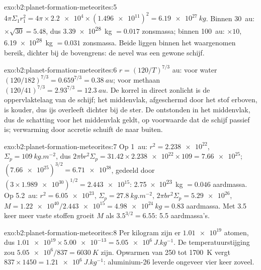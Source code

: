 \begin{solution}{exo:b2:planet-formation-meteorites:5}
$4\pi\Sigma_1 r_1^2 = 4\pi\times\num{2.2e4}\times(\num{1.496e11})^2 =
\qty{6.19e27}{kg}$. Binnen \qty{30}{au}: $\times\sqrt{30} = 5.48$, dus
\qty{3.39e28}{kg} $= 0.017$ zonsmassa; binnen \qty{100}{au}: $\times10$,
\qty{6.19e28}{kg} $= 0.031$ zonsmassa. Beide liggen binnen het waargenomen bereik,
dichter bij de bovengrens: de nevel was een gewone schijf.
\end{solution}

\begin{solution}{exo:b2:planet-formation-meteorites:6}
$r = (120/T)^{7/3}$ au: voor water $(120/182)^{7/3} = 0.659^{7/3} =
\qty{0.38}{au}$; voor methaan $(120/41)^{7/3} = 2.93^{7/3} = \qty{12.3}{au}$.
De korrel in direct zonlicht is de oppervlaktelaag van de schijf; het middenvlak,
afgeschermd door het stof erboven, is kouder, dus ijs overleeft dichter bij de ster. De
 ontstonden in het middenvlak, dus de schatting voor het middenvlak geldt, op voorwaarde dat
de schijf passief is; verwarming door accretie schuift de  naar buiten.
\end{solution}

\begin{solution}{exo:b2:planet-formation-meteorites:7}
Op \qty{1}{au}: $r^2 = \num{2.238e22}$, $\Sigma_p = \qty{109}{kg.m^{-2}}$, dus
$2\pi b r^2\Sigma_p = 31.42\times\num{2.238e22}\times109 = \num{7.66e25}$;
$(\num{7.66e25})^{3/2} = \num{6.71e38}$, gedeeld door
$(3\times\num{1.989e30})^{1/2} = \num{2.443e15}$: \qty{2.75e23}{kg}
$= 0.046$ aardmassa. Op \qty{5.2}{au}: $r^2 = \num{6.05e23}$,
$\Sigma_p = \qty{27.8}{kg.m^{-2}}$, $2\pi b r^2\Sigma_p = \num{5.29e26}$,
$M = \num{1.22e40}/\num{2.443e15} = \qty{4.98e24}{kg} = 0.83$ aardmassa.
Met \num{3.5} keer meer vaste stoffen groeit $M$ als $3.5^{3/2} = 6.55$: 5.5
aardmassa's.
\end{solution}

\begin{solution}{exo:b2:planet-formation-meteorites:8}
Per kilogram zijn er $\num{1.01e19}$ atomen, dus
$\num{1.01e19}\times\num{5.00e-13} = \qty{5.05e6}{J.kg^{-1}}$. De
temperatuurstijging zou $\num{5.05e6}/837 = \qty{6030}{K}$ zijn. Opwarmen van \num{250} tot
\qty{1700}{K} vergt $837\times1450 = \qty{1.21e6}{J.kg^{-1}}$: aluminium-26
leverde ongeveer vier keer zoveel.
\end{solution}

